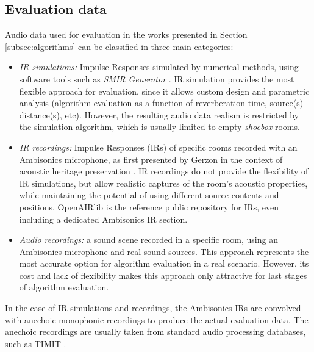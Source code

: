 \subsection{Evaluation data}
\label{subsec:evaluationdata}

Audio data used for evaluation in the works presented in Section \ref{subsec:algorithms} can be classified in  three main categories:


\begin{itemize}

    \item \textit{IR simulations:} Impulse Responses simulated by numerical methods, using software tools such as \textit{SMIR Generator} \cite{smir}. IR simulation provides the most flexible approach for evaluation, since it allows custom design and parametric analysis (algorithm evaluation as a function of reverberation time, source(s) distance(s), etc). However, the resulting audio data realism is restricted by the simulation algorithm, which is usually limited to empty \textit{shoebox} rooms.
    
    \item \textit{IR recordings:} Impulse Responses (IRs) of specific rooms recorded with an Ambisonics microphone, as first presented by Gerzon in the context of acoustic heritage preservation \cite{gerzon1975recording}. IR recordings do not provide the flexibility of IR simulations, but allow realistic captures of the room's acoustic properties, while maintaining the potential of using different source contents and positions. OpenAIRlib \cite{murphy2010openair} is the reference public repository for IRs, even including a dedicated Ambisonics IR section.

    \item \textit{Audio recordings:} a sound scene recorded in a specific room, using an Ambisonics microphone and real sound sources. This approach  represents the  most  accurate  option  for algorithm evaluation in a real scenario. However, its cost and lack of flexibility makes this approach only attractive for last stages of algorithm  evaluation.

\end{itemize}

In the case of IR simulations and recordings, the Ambisonics IRs are convolved with anechoic monophonic recordings to produce the actual evaluation data. The anechoic recordings are usually taken from standard audio processing databases, such as TIMIT \cite{timit}. \\

